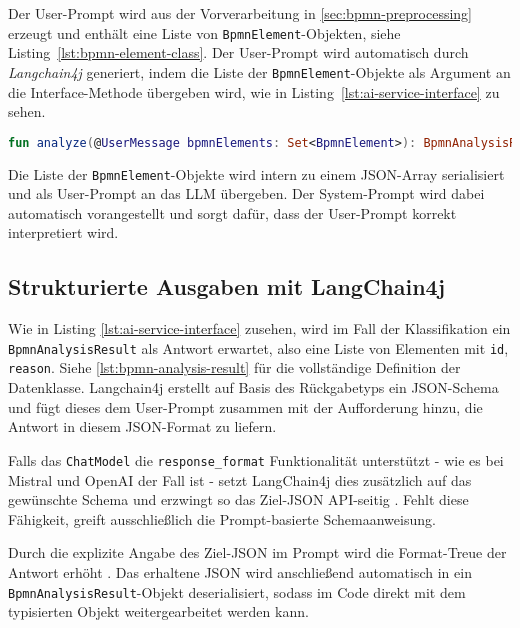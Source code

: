 Der User-Prompt wird aus der Vorverarbeitung in \ref{sec:bpmn-preprocessing} erzeugt und enthält eine Liste von \texttt{BpmnElement}-Objekten, siehe Listing~\ref{lst:bpmn-element-class}. Der User-Prompt wird automatisch durch \emph{Langchain4j} generiert, indem die Liste der \texttt{BpmnElement}-Objekte als Argument an die Interface-Methode übergeben wird, wie in Listing~\ref{lst:ai-service-interface} zu sehen.

\begin{lstlisting}[language=Kotlin,caption={Deklarative Schnittstelle für die Analyse eines \ac{BPMN}-Prozesses.},label={lst:ai-service-interface}]
fun analyze(@UserMessage bpmnElements: Set<BpmnElement>): BpmnAnalysisResult
\end{lstlisting}

Die Liste der \texttt{BpmnElement}-Objekte wird intern zu einem JSON-Array serialisiert und als User-Prompt an das \ac{LLM} übergeben. Der System-Prompt wird dabei automatisch vorangestellt und sorgt dafür, dass der User-Prompt korrekt interpretiert wird.

\subsection*{Strukturierte Ausgaben mit LangChain4j}

Wie in Listing \ref{lst:ai-service-interface} zusehen, wird im Fall der Klassifikation ein \texttt{BpmnAnalysisResult} als Antwort erwartet, also eine Liste von Elementen mit \texttt{id}, \texttt{reason}. Siehe \ref{lst:bpmn-analysis-result} für die vollständige Definition der Datenklasse. Langchain4j erstellt auf Basis des Rückgabetyps ein JSON-Schema und fügt dieses dem User-Prompt zusammen mit der Aufforderung hinzu, die Antwort in diesem JSON-Format zu liefern.

Falls das \texttt{ChatModel} die \texttt{response\_format} Funktionalität unterstützt - wie es bei Mistral und OpenAI der Fall ist \cite{mistralai_structured_output, openai_structured_output} - setzt LangChain4j dies zusätzlich auf das gewünschte Schema und erzwingt so das Ziel-JSON API-seitig \cite{langchain4j-ai-services}. Fehlt diese Fähigkeit, greift ausschließlich die Prompt-basierte Schemaanweisung.

Durch die explizite Angabe des Ziel-JSON im Prompt wird die Format-Treue der Antwort erhöht \cite{liu2023prompting}. Das erhaltene JSON wird anschließend automatisch in ein \texttt{BpmnAnalysisResult}-Objekt deserialisiert, sodass im Code direkt mit dem typisierten Objekt weitergearbeitet werden kann.